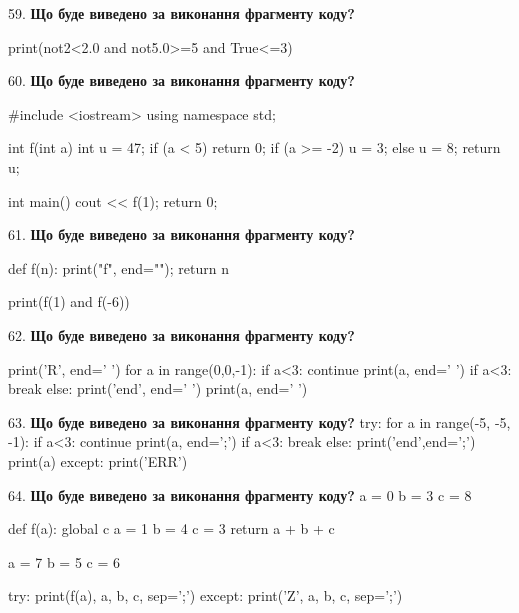 \documentclass[11pt]{article}
\begin{document}
59. \textbf{Що буде виведено за виконання фрагменту коду?}

print(not2<2.0 and not5.0>=5 and True<=3)
\par\vspace{5mm}

60. \textbf{Що буде виведено за виконання фрагменту коду?}

#include <iostream>
using namespace std;

int f(int a){
    int u = 47;
    if (a < 5) 
        return 0;
    if (a >= -2)
         u = 3;
    else
         u = 8;
    return u;
}

int main(){
    cout << f(1);
    return 0;
}

\par\vspace{5mm}

61. \textbf{Що буде виведено за виконання фрагменту коду?}

def f(n):
    print("f", end="");
    return n

print(f(1) and f(-6))
\par\vspace{5mm}

62. \textbf{Що буде виведено за виконання фрагменту коду?}

print('R', end=' ')
for a in range(0,0,-1):
    if a<3:
        continue
        print(a, end=' ')
    if a<3:
        break
    else:
        print('end', end=' ')
    print(a, end=' ')
\par\vspace{5mm}

63. \textbf{Що буде виведено за виконання фрагменту коду?}
try:
    for a in range(-5, -5, -1):
        if a<3:
            continue
        print(a, end=';')
        if a<3:
            break
    else:
        print('end',end=';')
    print(a)
except:
    print('ERR')
\par\vspace{5mm}

64. \textbf{Що буде виведено за виконання фрагменту коду?}
a = 0
b = 3
c = 8

def f(a):
global c    a = 1
    b = 4
    c = 3
    return a + b + c

a = 7
b = 5
c = 6

try:
    print(f(a), a, b, c, sep=';')
except:
    print('Z', a, b, c, sep=';')
\par\vspace{5mm}
\end{document}
